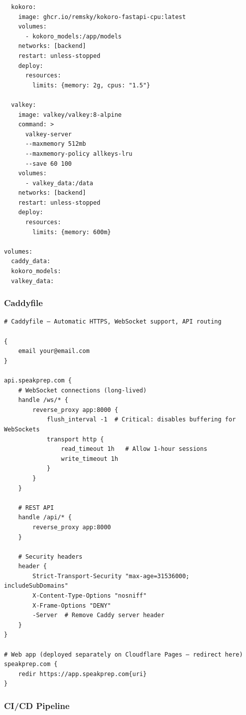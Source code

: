 \documentclass[
  11pt,
]{article}
\begin{document}
\begin{lstlisting}
  kokoro:
    image: ghcr.io/remsky/kokoro-fastapi-cpu:latest
    volumes:
      - kokoro_models:/app/models
    networks: [backend]
    restart: unless-stopped
    deploy:
      resources:
        limits: {memory: 2g, cpus: "1.5"}
  
  valkey:
    image: valkey/valkey:8-alpine
    command: >
      valkey-server
      --maxmemory 512mb
      --maxmemory-policy allkeys-lru
      --save 60 100
    volumes:
      - valkey_data:/data
    networks: [backend]
    restart: unless-stopped
    deploy:
      resources:
        limits: {memory: 600m}

volumes:
  caddy_data:
  kokoro_models:
  valkey_data:
\end{lstlisting}

\hypertarget{caddyfile}{%
\subsubsection{Caddyfile}\label{caddyfile}}

\begin{lstlisting}
# Caddyfile — Automatic HTTPS, WebSocket support, API routing

{
    email your@email.com
}

api.speakprep.com {
    # WebSocket connections (long-lived)
    handle /ws/* {
        reverse_proxy app:8000 {
            flush_interval -1  # Critical: disables buffering for WebSockets
            transport http {
                read_timeout 1h   # Allow 1-hour sessions
                write_timeout 1h
            }
        }
    }
    
    # REST API
    handle /api/* {
        reverse_proxy app:8000
    }
    
    # Security headers
    header {
        Strict-Transport-Security "max-age=31536000; includeSubDomains"
        X-Content-Type-Options "nosniff"
        X-Frame-Options "DENY"
        -Server  # Remove Caddy server header
    }
}

# Web app (deployed separately on Cloudflare Pages — redirect here)
speakprep.com {
    redir https://app.speakprep.com{uri}
}
\end{lstlisting}

\hypertarget{cicd-pipeline}{%
\subsubsection{CI/CD Pipeline}\label{cicd-pipeline}}
\end{document}

